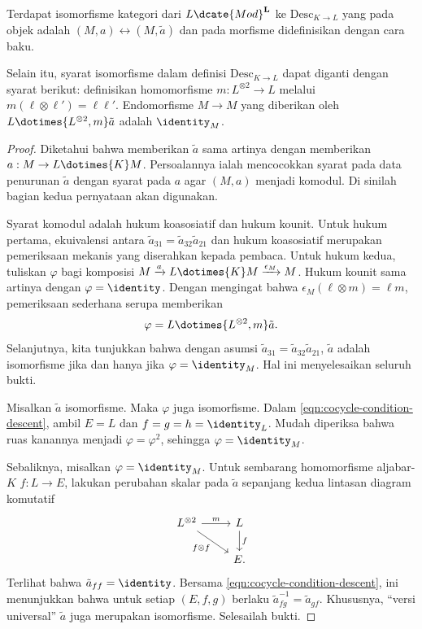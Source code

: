 \begin{lemma}\label{prop:descent-data-vs-comodule}
	Terdapat isomorfisme kategori dari $L\dcate{Mod}^{\mathbf{L}}$ ke
	$\mathrm{Desc}_{K\to L}$ yang pada objek adalah
	$(M,a)\leftrightarrow(M,\tilde a)$ dan pada morfisme didefinisikan dengan
	cara baku.

	Selain itu, syarat isomorfisme dalam definisi
	$\mathrm{Desc}_{K\to L}$ dapat diganti dengan syarat berikut: definisikan
	homomorfisme $m:L^{\otimes2}\to L$ melalui
	$m(\ell\otimes\ell')=\ell\ell'$. Endomorfisme $M\to M$ yang diberikan oleh
	$L\dotimes{L^{\otimes2},m}\tilde a$ adalah $\identity_M$.
\end{lemma}
\begin{proof}
	Diketahui bahwa memberikan $\tilde a$ sama artinya dengan memberikan
	$a:M\to L\dotimes{K}M$. Persoalannya ialah mencocokkan syarat pada data
	penurunan $\tilde a$ dengan syarat pada $a$ agar $(M,a)$ menjadi komodul.
	Di sinilah bagian kedua pernyataan akan digunakan.

	Syarat komodul adalah hukum koasosiatif dan hukum kounit. Untuk hukum
	pertama, ekuivalensi antara
	$\tilde a_{31}=\tilde a_{32}\tilde a_{21}$ dan hukum koasosiatif merupakan
	pemeriksaan mekanis yang diserahkan kepada pembaca. Untuk hukum kedua,
	tuliskan $\varphi$ bagi komposisi
	$M\xrightarrow{a}L\dotimes{K}M\xrightarrow{\epsilon_M}M$. Hukum kounit
	sama artinya dengan $\varphi=\identity$. Dengan mengingat bahwa
	$\epsilon_M(\ell\otimes m)=\ell m$, pemeriksaan sederhana serupa memberikan
	\[ \varphi = L \dotimes{L^{\otimes 2}, m} \tilde{a}. \]
	Selanjutnya, kita tunjukkan bahwa dengan asumsi
	$\tilde a_{31}=\tilde a_{32}\tilde a_{21}$, $\tilde a$ adalah isomorfisme
	jika dan hanya jika $\varphi=\identity_M$. Hal ini menyelesaikan seluruh
	bukti.

	Misalkan $\tilde a$ isomorfisme. Maka $\varphi$ juga isomorfisme. Dalam
	\eqref{eqn:cocycle-condition-descent}, ambil $E=L$ dan
	$f=g=h=\identity_L$. Mudah diperiksa bahwa ruas kanannya menjadi
	$\varphi=\varphi^2$, sehingga $\varphi=\identity_M$.

Sebaliknya, misalkan $\varphi=\identity_M$. Untuk sembarang homomorfisme
aljabar-$K$ $f:L\to E$, lakukan perubahan skalar pada $\tilde a$ sepanjang kedua
	lintasan diagram komutatif
	\[\begin{tikzcd}
		L^{\otimes 2} \arrow[rd, "{f \otimes f}"'] \arrow[r, "m"] & L \arrow[d, "f"] \\
		& E.
	\end{tikzcd}\]
	Terlihat bahwa $\tilde a_{ff}=\identity$. Bersama
	\eqref{eqn:cocycle-condition-descent}, ini menunjukkan bahwa untuk setiap
	$(E,f,g)$ berlaku $\tilde a_{fg}^{-1}=\tilde a_{gf}$. Khususnya, ``versi
	universal'' $\tilde a$ juga merupakan isomorfisme. Selesailah bukti.
\end{proof}

